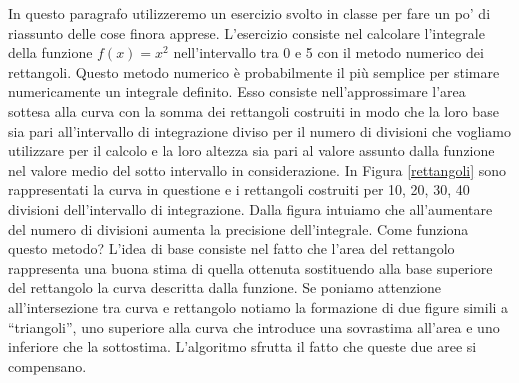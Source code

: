 \documentclass[11pt,fleqn]{book} %
\begin{document}
In questo paragrafo utilizzeremo un esercizio svolto in classe per fare un po' di riassunto delle cose finora apprese. L'esercizio
consiste nel calcolare l'integrale della funzione $f(x) = x^2$ nell'intervallo tra 0 e 5 con il metodo numerico dei rettangoli.
Questo metodo numerico è probabilmente il più semplice per stimare numericamente un integrale definito. Esso consiste nell'approssimare l'area sottesa alla curva con la somma dei rettangoli costruiti in modo che la loro base sia pari all'intervallo di integrazione diviso per il numero di divisioni che vogliamo utilizzare per il calcolo e la loro altezza sia pari al valore assunto dalla funzione nel valore medio del sotto intervallo in considerazione.
In Figura \ref{rettangoli} sono rappresentati la curva in questione e i rettangoli costruiti per 10, 20, 30, 40 divisioni dell'intervallo di integrazione. Dalla figura intuiamo che all'aumentare del numero di divisioni aumenta la precisione dell'integrale.
Come funziona questo metodo? L'idea di base consiste nel fatto che l'area del rettangolo rappresenta una buona stima di quella ottenuta sostituendo alla base superiore del rettangolo la curva descritta dalla funzione. Se poniamo attenzione all'intersezione tra curva e rettangolo notiamo la formazione di due  figure simili a ``triangoli'', uno superiore alla curva che introduce una sovrastima all'area e uno inferiore che la sottostima. L'algoritmo sfrutta il fatto che queste due aree si compensano.
\end{document}
